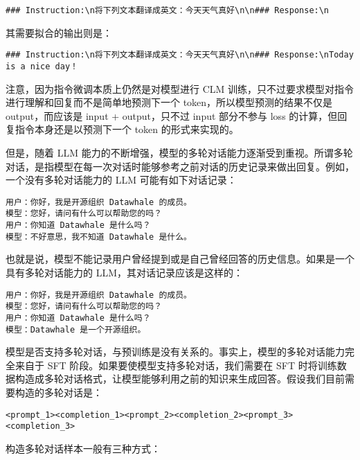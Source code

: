 \documentclass[
]{article}
\begin{document}
\begin{verbatim}
### Instruction:\n将下列文本翻译成英文：今天天气真好\n\n### Response:\n
\end{verbatim}

其需要拟合的输出则是：

\begin{verbatim}
### Instruction:\n将下列文本翻译成英文：今天天气真好\n\n### Response:\nToday is a nice day！
\end{verbatim}

注意，因为指令微调本质上仍然是对模型进行 CLM
训练，只不过要求模型对指令进行理解和回复而不是简单地预测下一个
token，所以模型预测的结果不仅是 output，而应该是 input + output，只不过
input 部分不参与 loss 的计算，但回复指令本身还是以预测下一个 token
的形式来实现的。

但是，随着 LLM
能力的不断增强，模型的多轮对话能力逐渐受到重视。所谓多轮对话，是指模型在每一次对话时能够参考之前对话的历史记录来做出回复。例如，一个没有多轮对话能力的
LLM 可能有如下对话记录：

\begin{verbatim}
用户：你好，我是开源组织 Datawhale 的成员。
模型：您好，请问有什么可以帮助您的吗？
用户：你知道 Datawhale 是什么吗？
模型：不好意思，我不知道 Datawhale 是什么。
\end{verbatim}

也就是说，模型不能记录用户曾经提到或是自己曾经回答的历史信息。如果是一个具有多轮对话能力的
LLM，其对话记录应该是这样的：

\begin{verbatim}
用户：你好，我是开源组织 Datawhale 的成员。
模型：您好，请问有什么可以帮助您的吗？
用户：你知道 Datawhale 是什么吗？
模型：Datawhale 是一个开源组织。
\end{verbatim}

模型是否支持多轮对话，与预训练是没有关系的。事实上，模型的多轮对话能力完全来自于
SFT 阶段。如果要使模型支持多轮对话，我们需要在 SFT
时将训练数据构造成多轮对话格式，让模型能够利用之前的知识来生成回答。假设我们目前需要构造的多轮对话是：

\begin{verbatim}
<prompt_1><completion_1><prompt_2><completion_2><prompt_3><completion_3>
\end{verbatim}

构造多轮对话样本一般有三种方式：
\end{document}

